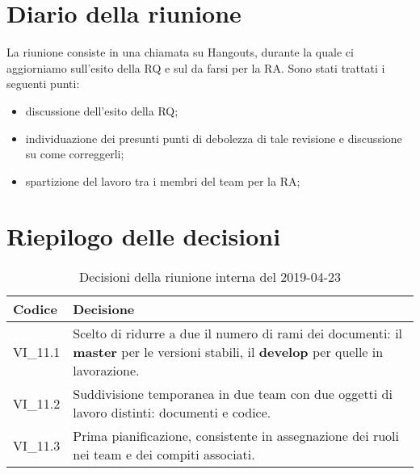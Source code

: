 \section{Diario della riunione}
La riunione consiste in una chiamata su Hangouts, durante la quale ci aggiorniamo sull'esito della RQ e sul da farsi per la RA.
Sono stati trattati i seguenti punti:
\begin{itemize}
	\item discussione dell'esito della RQ;
	\item individuazione dei presunti punti di debolezza di tale revisione e discussione su come correggerli;
	\item spartizione del lavoro tra i membri del team per la RA;
	
\end{itemize}

\hspace{3cm}

\section{Riepilogo delle decisioni}

	
	\begin{longtable}{ >{\centering}p{} >{}p{}}
		\caption{Decisioni della riunione interna del 2019-04-23}\\	
		\rowcolorhead
		\textbf{\color{white}Codice} 
		& \centering\textbf{\color{white}Decisione} 
		\tabularnewline 
		\endfirsthead
		VI\_11.1 & Scelto di ridurre a due il numero di rami dei documenti: il \textbf{master} per le versioni stabili, il \textbf{develop} per quelle in lavorazione.
		\tabularnewline 
		VI\_11.2 & Suddivisione temporanea in due team con due oggetti di lavoro distinti: documenti e codice.
		\tabularnewline 
		VI\_11.3 & Prima pianificazione, consistente in assegnazione dei ruoli nei team e dei compiti associati.
		
	\end{longtable}
	




